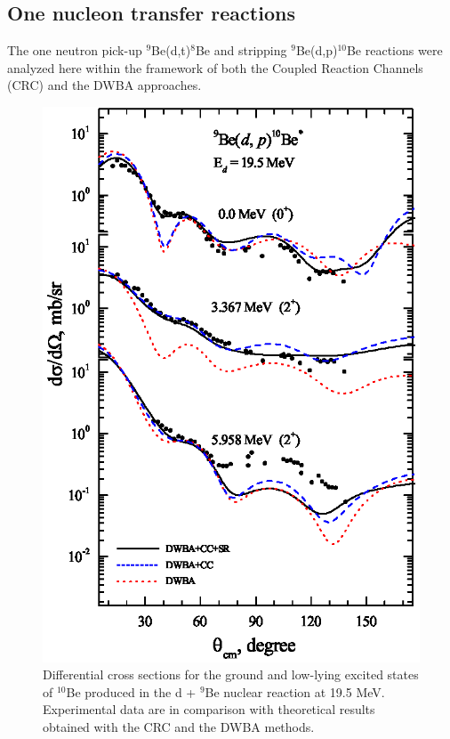 \documentclass[10pt]{iopart}
\begin{document}
\subsection{One nucleon transfer reactions }
The one neutron pick-up ${}^9$Be(d,t)${}^8$Be and stripping ${}^9$Be(d,p)${}^{10}$Be reactions were analyzed here within the framework of both the Coupled Reaction Channels (CRC) and the DWBA approaches.

\begin{figure}[tp]
\includegraphics[scale=0.8]{1H10BE.eps}
\caption{\label{1H10BE} Differential cross sections for the ground and low-lying excited states of $^{10}$Be  produced in the d + $^9$Be nuclear reaction at 19.5 MeV. Experimental data are in comparison with  theoretical results obtained with the CRC and the DWBA methods.  }
\end{figure}
\end{document}
